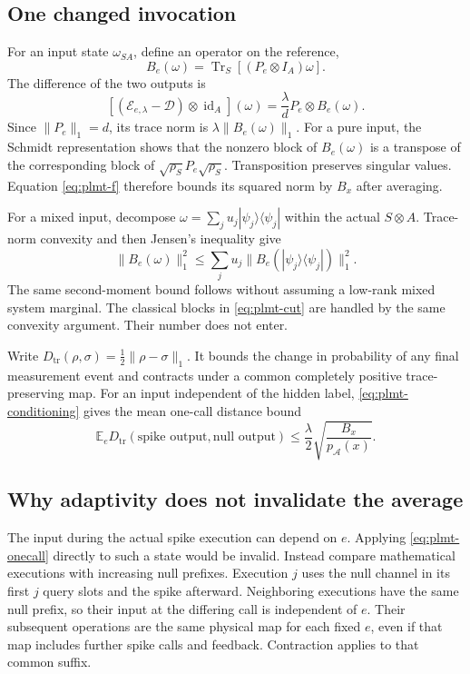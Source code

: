 \documentclass[11pt,a4paper]{article}
\numberwithin{equation}{section}
\theoremstyle{definition}
\theoremstyle{remark}
\newcommand{\Dep}{\mathcal D}
\begin{document}
\subsection{One changed invocation}
For an input state \(\omega_{SA}\), define an operator on the reference,
\[
 B_e(\omega)=
 \operatorname{Tr}_S[(P_e\otimes I_A)\omega].
\]
The difference of the two outputs is
\[
 [(\mathcal E_{e,\lambda}-\Dep)\otimes\operatorname{id}_A](\omega)
 =\frac{\lambda}{d}P_e\otimes B_e(\omega).
\]
Since \(\|P_e\|_1=d\), its trace norm is
\(\lambda\|B_e(\omega)\|_1\). For a pure input, the Schmidt representation shows that the nonzero block of \(B_e(\omega)\) is a transpose of the corresponding block of \(\sqrt{\rho_S}P_e\sqrt{\rho_S}\). Transposition preserves singular values. Equation \eqref{eq:plmt-f} therefore bounds its squared norm by \(B_x\) after averaging.

For a mixed input, decompose \(\omega=\sum_ju_j|\psi_j\rangle\langle\psi_j|\) within the actual \(S\otimes A\). Trace-norm convexity and then Jensen's inequality give
\[
 \|B_e(\omega)\|_1^2
 \leq\sum_ju_j\|B_e(|\psi_j\rangle\langle\psi_j|)\|_1^2.
\]
The same second-moment bound follows without assuming a low-rank mixed system marginal. The classical blocks in \eqref{eq:plmt-cut} are handled by the same convexity argument. Their number does not enter.

Write \(D_{\mathrm{tr}}(\rho,\sigma)=\frac12\|\rho-\sigma\|_1\). It bounds the change in probability of any final measurement event and contracts under a common completely positive trace-preserving map. For an input independent of the hidden label, \eqref{eq:plmt-conditioning} gives the mean one-call distance bound
\begin{equation}
 \mathbb E_eD_{\mathrm{tr}}(\text{spike output},\text{null output})
 \leq\frac{\lambda}{2}\sqrt{\frac{B_x}{p_{\mathcal A}(x)}}.
 \label{eq:plmt-onecall}
\end{equation}

\subsection{Why adaptivity does not invalidate the average}
The input during the actual spike execution can depend on \(e\). Applying \eqref{eq:plmt-onecall} directly to such a state would be invalid. Instead compare mathematical executions with increasing null prefixes. Execution \(j\) uses the null channel in its first \(j\) query slots and the spike afterward. Neighboring executions have the same null prefix, so their input at the differing call is independent of \(e\). Their subsequent operations are the same physical map for each fixed \(e\), even if that map includes further spike calls and feedback. Contraction applies to that common suffix.
\end{document}
